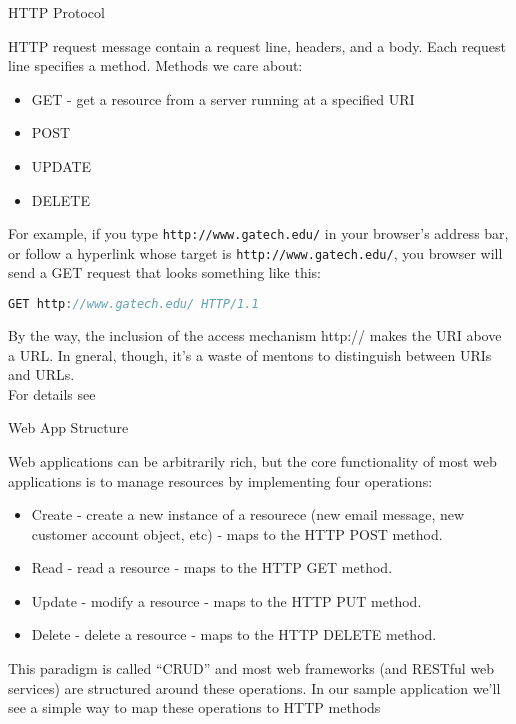 \documentclass{beamer}
\begin{document}
\begin{frame}[fragile]{HTTP Protocol}


HTTP request message contain a request line, headers, and a body.  Each request line specifies a method.  Methods we care about:
\begin{itemize}
\item GET - get a resource from a server running at a specified URI
\item POST
\item UPDATE
\item DELETE
\end{itemize}
For example, if you type {\tt http://www.gatech.edu/} in your browser's address bar, or follow a hyperlink whose target is {\tt http://www.gatech.edu/}, you browser will send a GET request that looks something like this:
\begin{lstlisting}[language=Java]
GET http://www.gatech.edu/ HTTP/1.1
\end{lstlisting}
By the way, the inclusion of the access mechanism http:// makes the URI above a URL.  In gneral, though, it's a waste of mentons to distinguish between URIs and URLs.\\

For details see 

\end{frame}

\begin{frame}[fragile]{Web App Structure}


Web applications can be arbitrarily rich, but the core functionality of most web applications is to manage resources by implementing four operations:

\begin{itemize}
\item Create - create a new instance of a resourece (new email message, new customer account object, etc) - maps to the HTTP POST method.
\item Read - read a resource - maps to the HTTP GET method.
\item Update - modify a resource - maps to the HTTP PUT method.
\item Delete - delete a resource - maps to the HTTP DELETE method.
\end{itemize}
This paradigm is called ``CRUD'' and most web frameworks (and RESTful web services) are structured around these operations.  In our sample application we'll see a simple way to map these operations to HTTP methods

\end{frame}
\end{document}
